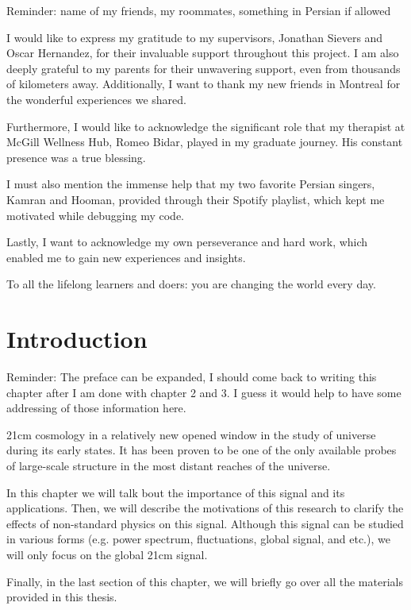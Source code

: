 \documentclass[12pt, TexShade, letterpaper]{report}
\begin{document}
Reminder: name of my friends, my roommates, something in Persian if allowed \par 
I would like to express my gratitude to my supervisors, Jonathan Sievers and Oscar Hernandez, for their invaluable support throughout this project. I am also deeply grateful to my parents for their unwavering support, even from thousands of kilometers away. Additionally, I want to thank my new friends in Montreal for the wonderful experiences we shared.\par
Furthermore, I would like to acknowledge the significant role that my therapist at McGill Wellness Hub, Romeo Bidar, played in my graduate journey. His constant presence was a true blessing.\par
I must also mention the immense help that my two favorite Persian singers, Kamran and Hooman, provided through their Spotify playlist, which kept me motivated while debugging my code.\par
Lastly, I want to acknowledge my own perseverance and hard work, which enabled me to gain new experiences and insights.\par
 To all the lifelong learners and doers: you are changing the world every day.
	\tableofcontents\thispagestyle{plain}

	\listoffigures\thispagestyle{plain}
	\listoftables
	\glsaddall
	\setlength\LTleft{0pt}
	\setlength\LTright{0pt}
	\setlength\glsdescwidth{0.8\hsize}
	\printglossary[title={List of Acronyms}]

 	\clearpage
	
	\glsresetall
\chapter{Introduction}
\label{chap:intro}
Reminder: The preface can be expanded, I should come back to writing this chapter after I am done with chapter 2 and 3. I guess it would help to have some addressing of those information here. \par
21cm cosmology in a relatively new opened window in the study of universe during its early states. It has been proven to be one of the only available probes of large-scale structure in the most distant reaches of the universe\cite{primordial_universe}.\par
In this chapter we will talk bout the importance of this signal and its applications. Then, we will describe the motivations of this research to clarify the effects of non-standard physics on this signal. Although this signal can be studied in various forms (e.g. power spectrum, fluctuations, global signal, and etc.), we will only focus on the global 21cm signal.\par
Finally, in the last section of this chapter, we will briefly go over all the materials provided in this thesis.\par
\end{document}
